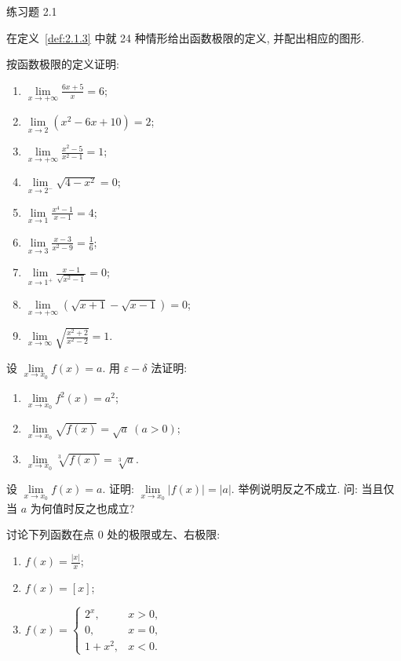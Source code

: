 \begin{exblock}{练习题 2.1}
  \item 在定义~\ref{def:2.1.3} 中就 24 种情形给出函数极限的定义, 并配出相应的图形.
  \item 按函数极限的定义证明:
  \begin{enumerate}[label=(\arabic*)]
    \item $\lim\limits_{x \to +\infty} \frac{6x + 5}{x} = 6$;
    \item $\lim\limits_{x \to 2} (x^2 - 6x + 10) = 2$;
    \item $\lim\limits_{x \to +\infty} \frac{x^2 - 5}{x^2 - 1} = 1$;
    \item $\lim\limits_{x \to 2^-} \sqrt{4 - x^2} = 0$;
    \item $\lim\limits_{x \to 1} \frac{x^4 - 1}{x - 1} = 4$;
    \item $\lim\limits_{x \to 3} \frac{x - 3}{x^2 - 9} = \frac{1}{6}$;
    \item $\lim\limits_{x\to1^{+}}\frac{x-1}{\sqrt{x^{2}-1}}=0$;
    \item $\lim\limits_{x \to +\infty} (\sqrt{x+1} - \sqrt{x-1}) = 0$;
    \item $\lim\limits_{x \to \infty} \sqrt{\frac{x^2 + 2}{x^2 - 2}} = 1$.
  \end{enumerate}
  \item 设 $\lim\limits_{x \to x_0} f(x) = a$. 用 $\varepsilon - \delta$ 法证明:
  \begin{enumerate}[label=(\arabic*)]
    \item $\lim\limits_{x \to x_0} f^2(x) = a^2$;
    \item $\lim\limits_{x \to x_0} \sqrt{f(x)} = \sqrt{a}\ (a > 0)$;
    \item $\lim\limits_{x \to x_0} \sqrt[3]{f(x)} = \sqrt[3]{a}$.
  \end{enumerate}
  \item 设 $\lim\limits_{x \to x_0} f(x) = a$. 证明: $\lim\limits_{x \to x_0} |f(x)| = |a|$. 举例说明反之不成立. 问: 当且仅当 $a$ 为何值时反之也成立?
  \item 讨论下列函数在点 $0$ 处的极限或左、右极限:
  \begin{enumerate}[label=(\arabic*)]
    \item $f(x)=\frac{|x|}{x}$;
    \item $f(x)=[x]$;
    \item $f(x)=\begin{cases} 2^{x}, & x>0, \\ 0, & x=0, \\ 1+x^{2}, & x<0. \end{cases}$

\end{enumerate}
\end{exblock}
